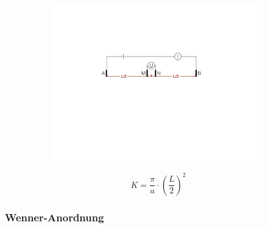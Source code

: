 \begin{figure}[H]
	\begin{subfigure}[m]{0.5\textwidth}
	\centering
		\includegraphics[scale = 0.4]{GeoelektrikBilder/SchlumbergerAnordnung}
	\end{subfigure}
	\begin{subfigure}[m]{0.5\textwidth}
		\begin{equation*}
			K = \frac{\pi}{a} \cdot \left( \frac{L}{2} \right)^2
		\end{equation*}
	\end{subfigure}
\end{figure}


\subsubsection{Wenner-Anordnung}


